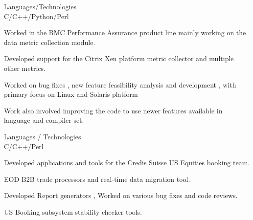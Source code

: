 \documentclass[a4,11pt]{cv4tw}
\begin{document}
{Languages/Technologies \\ C/C++/Python/Perl}
	{ 
	\begin{missions}	
		\item Worked  in the BMC Performance Assurance product line mainly working on the data metric collection module.
		\item Developed support for the Citrix Xen platform metric collector and multiple other metrics.
		\item Worked  on bug fixes , new feature feasibility analysis and development , with primary focus on Linux and Solaris platform
		\item Work also involved improving the code to use newer features available in language and compiler set.
	\end{missions}
}

{Languages / Technologies \\ C/C++/Perl}
	{ 
	\begin{missions}
		\item Developed applications and tools for the Credis Suisse US Equities booking team.
		\item EOD B2B trade processors and real-time data migration tool.
		\item Developed Report generators , Worked on various bug fixes and code reviews.
		\item US Booking subsystem stability checker tools.
	\end{missions}
}
\end{document}
